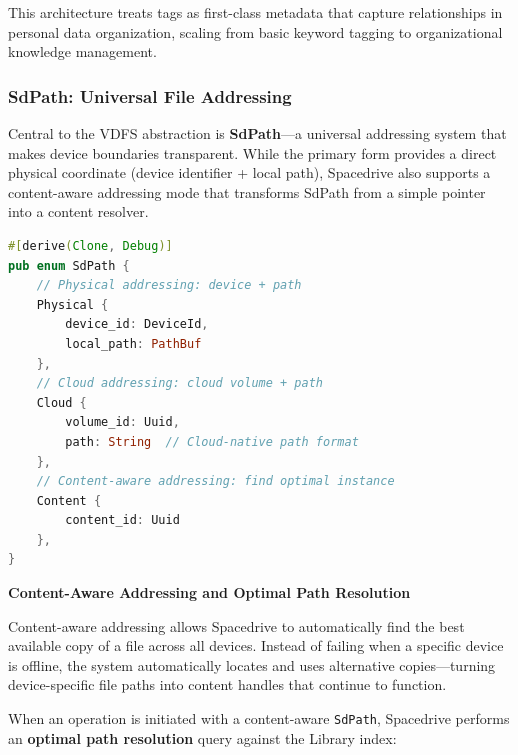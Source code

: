 \documentclass[sigconf]{acmart}
\begin{document}
This architecture treats tags as first-class metadata that capture relationships in personal data organization, scaling from basic keyword tagging to organizational knowledge management.

\subsubsection{SdPath: Universal File Addressing}
Central to the VDFS abstraction is \textbf{SdPath}---a universal addressing system that makes device boundaries transparent. While the primary form provides a direct physical coordinate (device identifier + local path), Spacedrive also supports a content-aware addressing mode that transforms SdPath from a simple pointer into a content resolver.

\begin{lstlisting}[language=Rust, caption={SdPath supports both physical and content-aware addressing}]
#[derive(Clone, Debug)]
pub enum SdPath {
    // Physical addressing: device + path
    Physical {
        device_id: DeviceId,
        local_path: PathBuf
    },
    // Cloud addressing: cloud volume + path
    Cloud {
        volume_id: Uuid,
        path: String  // Cloud-native path format
    },
    // Content-aware addressing: find optimal instance
    Content {
        content_id: Uuid
    },
}
\end{lstlisting}

\textbf{Content-Aware Addressing and Optimal Path Resolution}

Content-aware addressing allows Spacedrive to automatically find the best available copy of a file across all devices. Instead of failing when a specific device is offline, the system automatically locates and uses alternative copies---turning device-specific file paths into content handles that continue to function.

When an operation is initiated with a content-aware \texttt{SdPath}, Spacedrive performs an \textbf{optimal path resolution} query against the Library index:
\end{document}
